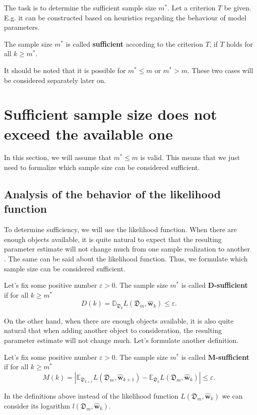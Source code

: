 \documentclass[
11pt,%
tightenlines,%
twoside,%
onecolumn,%
nofloats,%
nobibnotes,%
nofootinbib,%
superscriptaddress,%
noshowpacs,%
centertags]%
{revtex4-2}
\begin{document}
The task is to determine the sufficient sample size $m^*$. Let a criterion $T$ be given. E.g. it can be constructed based on heuristics regarding the behaviour of model parameters.
\begin{definition}
    The sample size $m^*$ is called \textbf{sufficient} according to the criterion $T$, if $T$ holds for all $k \geqslant m^*$.
\end{definition}
It should be noted that it is possible for $m^* \leqslant m$ or $m^* > m$. These two cases will be considered separately later on.

\section{Sufficient sample size does not exceed the available one}\label{sec2}

In this section, we will assume that $m^*\leqslant m$ is valid. This means that we just need to formalize which sample size can be considered sufficient.

\subsection{Analysis of the behavior of the likelihood function}

To determine sufficiency, we will use the likelihood function. When there are enough objects available, it is quite natural to expect that the resulting parameter estimate will not change much from one sample realization to another \cite{Joseph1997, Joseph1995}. The same can be said about the likelihood function. Thus, we formulate which sample size can be considered sufficient.

\begin{definition}
    \label{sufficient-variance}
    Let's fix some positive number $\varepsilon > 0$. The sample size $m^*$ is called \textbf{D-sufficient} if for all $k\geqslant m^*$
    \[ D(k) = \mathbb{D}_{\mathfrak{D}_k} L(\mathfrak{D}_m, \hat{\mathbf{w}}_{k}) \leqslant \varepsilon. \]
\end{definition}

On the other hand, when there are enough objects available, it is also quite natural that when adding another object to consideration, the resulting parameter estimate will not change much. Let's formulate another definition.

\begin{definition}
    \label{sufficient-difference}
    Let's fix some positive number $\varepsilon > 0$. The sample size $m^*$ is called \textbf{M-sufficient} if for all $k\geqslant m^*$ 
    \[ M(k) = \left| \mathbb{E}_{\mathfrak{D}_{k+1}} L(\mathfrak{D}_m, \hat{\mathbf{w}}_{k+1}) - \mathbb{E}_{\mathfrak{D}_k} L(\mathfrak{D}_m, \hat{\mathbf{w}}_{k}) \right| \leqslant \varepsilon. \]
\end{definition}
In the definitions above instead of the likelihood function $L(\mathfrak{D}_m, \hat{\mathbf{w}}_{k})$ we can consider its logarithm $l(\mathfrak{D}_m, \hat{\mathbf{w}}_{k})$.
\end{document}

